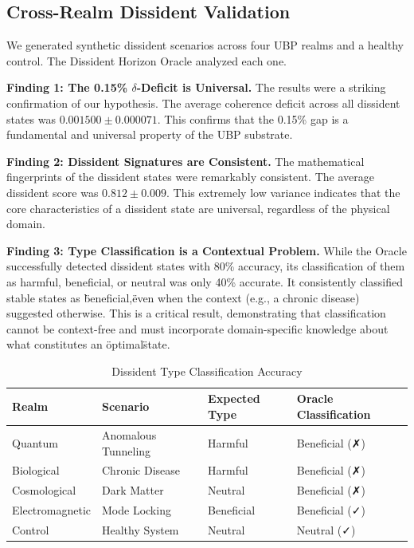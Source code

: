 \documentclass[12pt, a4paper]{article}
\begin{document}
\subsection{Cross-Realm Dissident Validation}
We generated synthetic dissident scenarios across four UBP realms and a healthy control. The Dissident Horizon Oracle analyzed each one.

\textbf{Finding 1: The 0.15\% $\delta$-Deficit is Universal.} The results were a striking confirmation of our hypothesis. The average coherence deficit across all dissident states was $0.001500 \pm 0.000071$. This confirms that the 0.15\% gap is a fundamental and universal property of the UBP substrate.

\textbf{Finding 2: Dissident Signatures are Consistent.} The mathematical fingerprints of the dissident states were remarkably consistent. The average dissident score was $0.812 \pm 0.009$. This extremely low variance indicates that the core characteristics of a dissident state are universal, regardless of the physical domain.

\textbf{Finding 3: Type Classification is a Contextual Problem.} While the Oracle successfully detected dissident states with 80\% accuracy, its classification of them as harmful, beneficial, or neutral was only 40\% accurate. It consistently classified stable states as \"beneficial,\" even when the context (e.g., a chronic disease) suggested otherwise. This is a critical result, demonstrating that classification cannot be context-free and must incorporate domain-specific knowledge about what constitutes an \"optimal\" state.

\begin{table}[h!]
\centering
\caption{Dissident Type Classification Accuracy}
\label{tab:type_accuracy}
\begin{tabular}{@{}llll@{}}
\toprule
\textbf{Realm} & \textbf{Scenario} & \textbf{Expected Type} & \textbf{Oracle Classification} \\
\midrule
Quantum & Anomalous Tunneling & Harmful & Beneficial (✗) \\
Biological & Chronic Disease & Harmful & Beneficial (✗) \\
Cosmological & Dark Matter & Neutral & Beneficial (✗) \\
Electromagnetic & Mode Locking & Beneficial & Beneficial (✓) \\
Control & Healthy System & Neutral & Neutral (✓) \\
\bottomrule
\end{tabular}
\end{table}
\end{document}
